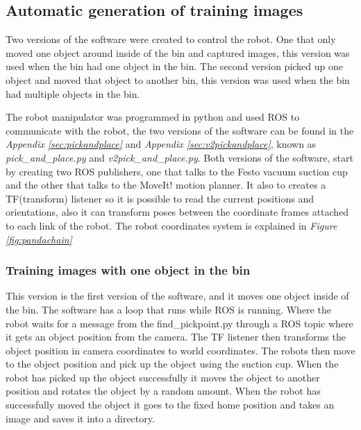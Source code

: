 \subsection{Automatic generation of training images}\label{sec:robot}
Two versions of the software were created to control the robot. One that only moved one object around inside of the bin and captured images, this version was used when the bin had one object in the bin. The second version picked up one object and moved that object to another bin, this version was used when the bin had multiple objects in the bin.

The robot manipulator was programmed in python and used ROS to communicate with the robot, the two versions of the software can be found in the \textit{Appendix \ref{sec:pickandplace}} and \textit{Appendix \ref{sec:v2pickandplace}}, known as \textit{pick\_and\_place.py} and \textit{v2pick\_and\_place.py}. 
Both versions of the software, start by creating two ROS publishers, one that talks to the Festo vacuum suction cup and the other that talks to the MoveIt! motion planner. 
It also to creates a TF(transform) listener so it is possible to read the current positions and orientations, also it can transform poses between the coordinate frames attached to each link of the robot. The robot coordinates system is explained in \textit{Figure \ref{fig:pandachain}} 

\subsubsection{Training images with one object in the bin}\label{robotcontrol}
This version is the first version of the software, and it moves one object inside of the bin. The software has a loop that runs while ROS is running. 
Where the robot waits for a message from the find\_pickpoint.py through a ROS topic where it gets an object position from the camera.
The TF listener then transforms the object position in camera coordinates to world coordinates. The robots then move to the object position and pick up the object using the suction cup. When the robot has picked up the object successfully it moves the object to another position and rotates the object by a random amount. When the robot has successfully moved the object it goes to the fixed home position and takes an image and saves it into a directory. 

